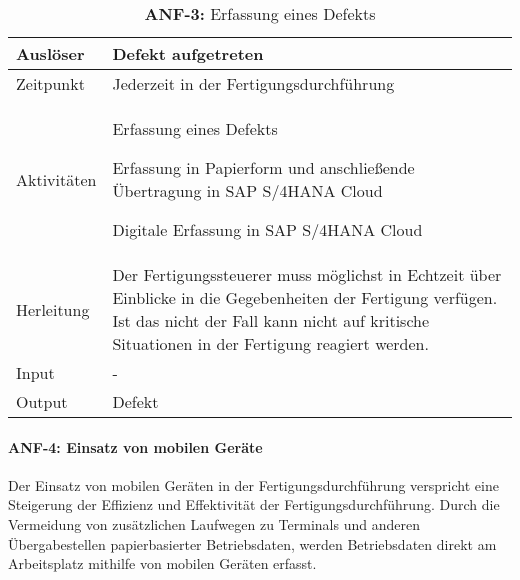 \begin{table}[H]
	\centering
	\begin{tabularx}{\textwidth}{|l|X|} 
		\hline
		Auslöser                                     &   
		Defekt aufgetreten \\ 
		\hline\hline
		Zeitpunkt                                     &   
		Jederzeit in der Fertigungsdurchführung \\ 
		\hline\hline
		Aktivitäten &   
		\begin{minipage}{4.8in}
    		\begin{compactenum}
        		\renewcommand{\labelenumi}{(\arabic{enumi})}
        		\item Erfassung eines Defekts
            		\begin{compactenum}
            		\renewcommand{\labelenumi}{(\arabic{enumi})}
            		\item Erfassung in Papierform und anschließende Übertragung in SAP S/4HANA Cloud
            		\item Digitale Erfassung in SAP S/4HANA Cloud
            		\end{compactenum}
    		\end{compactenum}
    		\vspace{1pt}		
		\end{minipage} \\
		\hline\hline
		Herleitung                                        &   
		Der Fertigungssteuerer muss möglichst in Echtzeit über Einblicke in die Gegebenheiten der Fertigung verfügen. 
		Ist das nicht der Fall kann nicht auf kritische Situationen in der Fertigung reagiert werden.\\
		\hline\hline
		Input                                         &   
		-  \\ 
		\hline\hline
		Output                                        &   
		Defekt \\
		\hline
	\end{tabularx}
	\caption{\label{tab:anf1}\textbf{ANF-3:} Erfassung eines Defekts}
\end{table}

\paragraph{ANF-4: Einsatz von mobilen Geräte}
Der Einsatz von mobilen Geräten in der Fertigungsdurchführung verspricht eine Steigerung der Effizienz und Effektivität der Fertigungsdurchführung. Durch die Vermeidung von zusätzlichen Laufwegen zu Terminals und anderen Übergabestellen papierbasierter Betriebsdaten, werden Betriebsdaten direkt am Arbeitsplatz mithilfe von mobilen Geräten erfasst.

